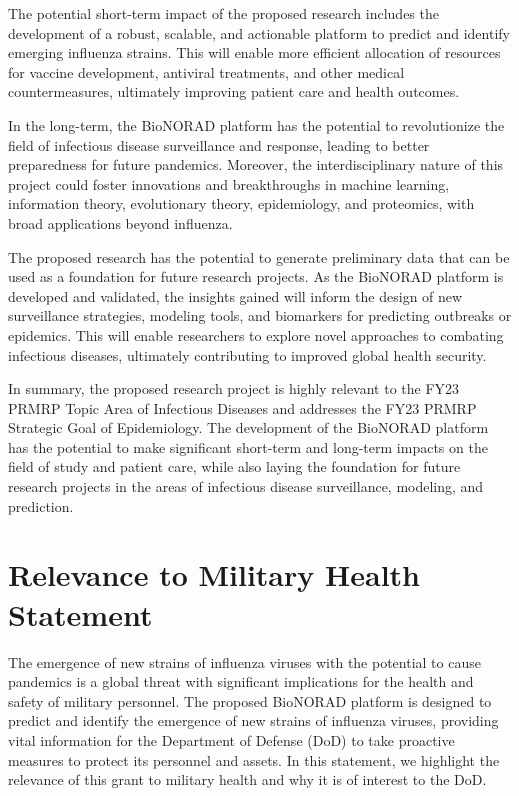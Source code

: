 \documentclass[onecolumn, compsoc,12pt]{IEEEtran}
\begin{document}
The potential short-term impact of the proposed research includes the development of a robust, scalable, and actionable platform to predict and identify emerging influenza strains. This will enable more efficient allocation of resources for vaccine development, antiviral treatments, and other medical countermeasures, ultimately improving patient care and health outcomes.

In the long-term, the BioNORAD platform has the potential to revolutionize the field of infectious disease surveillance and response, leading to better preparedness for future pandemics. Moreover, the interdisciplinary nature of this project could foster innovations and breakthroughs in machine learning, information theory, evolutionary theory, epidemiology, and proteomics, with broad applications beyond influenza.

The proposed research has the potential to generate preliminary data that can be used as a foundation for future research projects. As the BioNORAD platform is developed and validated, the insights gained will inform the design of new surveillance strategies, modeling tools, and biomarkers for predicting outbreaks or epidemics. This will enable researchers to explore novel approaches to combating infectious diseases, ultimately contributing to improved global health security.

In summary, the proposed research project is highly relevant to the FY23 PRMRP Topic Area of Infectious Diseases and addresses the FY23 PRMRP Strategic Goal of Epidemiology. The development of the BioNORAD platform has the potential to make significant short-term and long-term impacts on the field of study and patient care, while also laying the foundation for future research projects in the areas of infectious disease surveillance, modeling, and prediction.


\clearpage

\section*{Relevance to Military Health Statement}


The emergence of new strains of influenza viruses with the potential to cause pandemics is a global threat with significant implications for the health and safety of military personnel. The proposed BioNORAD platform is designed to predict and identify the emergence of new strains of influenza viruses, providing vital information for the Department of Defense (DoD) to take proactive measures to protect its personnel and assets. In this statement, we highlight the relevance of this grant to military health and why it is of interest to the DoD.
\end{document}
